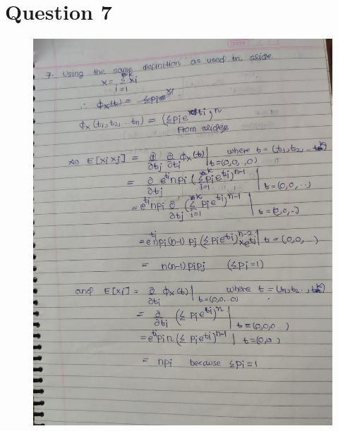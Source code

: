 \documentclass{article}
\theoremstyle{remark}
\begin{document}
\section{Question 7}
\begin{figure} [h!]
    \includegraphics[width=\textwidth, height=\textheight, keepaspectratio]{7a.jpeg}\par

\end{figure}
\end{document}
